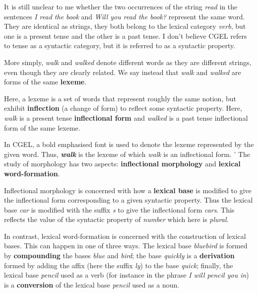 \documentclass{scrarticle}
\begin{document}
It is still unclear to me whether the two occurrences of the string \emph{read} in the sentences
\emph{I read the book} and \emph{Will you read the book?} represent the same word. They are
identical as strings, they both belong to the lexical category \emph{verb}, but one is a present
tense and the other is a past tense. I don't believe CGEL refers to tense as a syntactic category,
but it is referred to as a syntactic property.

More simply, \emph{walk} and \emph{walked} denote different words as they are different strings,
even though they are clearly related. We say instead that \emph{walk} and \emph{walked} are forms of
the same \textbf{lexeme}.

Here, a lexeme is a set of words that represent roughly the same notion, but exhibit
\textbf{inflection} (a change of form) to reflect some syntactic property. Here, \emph{walk} is a
present tense \textbf{inflectional form} and \emph{walked} is a past tense inflectional form of the
same lexeme.

In CGEL, a bold emphasised font is used to denote the lexeme represented by the given word. Thus,
\textbf{\emph{walk}} is the lexeme of which \emph{walk} is an inflectional form. 
'
The study of morphology has two aspects: \textbf{inflectional morphology} and \textbf{lexical
word-formation}.

Inflectional morphology is concerned with how a \textbf{lexical base} is modified to give the
inflectional form corresponding to a given syntactic property. Thus the lexical base \emph{car} is
modified with the suffix \emph{\textperiodcentered s} to give the inflectional form \emph{cars}.
This reflects the value of the syntactic property of \emph{number} which here is \emph{plural}.

In contrast, lexical word-formation is concerned with the construction of lexical bases. This can
happen in one of three ways. The lexical base \emph{bluebird} is formed by \textbf{compounding} the
bases \emph{blue} and \emph{bird}; the base \emph{quickly} is a \textbf{derivation} formed by adding
the affix (here the suffix \emph{\textperiodcentered ly}) to the base \emph{quick}; finally, the
lexical base \emph{pencil} used as a verb (for instance in the phrase \emph{I will pencil you in})
is a \textbf{conversion} of the lexical base \emph{pencil} used as a noun.
\end{document}
